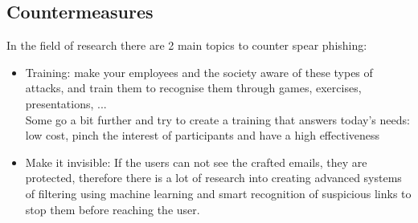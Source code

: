 \documentclass[12pt]{article} %
\begin{document}
\subsection{Countermeasures}
In the field of research there are 2 main topics to counter spear phishing\cite{state of phishing, urgency, filtering}:
\begin{itemize}
\item Training: make your employees and the society aware of these types of attacks, and train them to recognise them through games, exercises, presentations, ... \\
Some go a bit further and try to create a training that answers today's needs: low cost, pinch the interest of participants and have a high effectiveness\cite{fear}
\item Make it invisible: If the users can not see the crafted emails, they are protected, therefore there is a lot of research into creating advanced systems of filtering using machine learning and smart recognition of suspicious links to stop them before reaching the user.
\end{itemize}
\cite{future trends}
\end{document}
